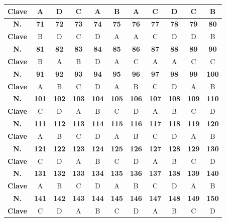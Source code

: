 \begin{center}
\begin{tabular}{|c|c|c|c|c|c|c|c|c|c|c|}
\hline
\textbf{Clave} & A & D & C & A & B & A & C & D & C & B \\
\hline
\textbf{N.} & \textbf{71} & \textbf{72} & \textbf{73} & \textbf{74} & \textbf{75} & \textbf{76} & \textbf{77} & \textbf{78} & \textbf{79} & \textbf{80} \\
\hline
\textbf{Clave} & B & D & C & D & A & A & C & D & D & B \\
\hline
\textbf{N.} & \textbf{81} & \textbf{82} & \textbf{83} & \textbf{84} & \textbf{85} & \textbf{86} & \textbf{87} & \textbf{88} & \textbf{89} & \textbf{90} \\
\hline
\textbf{Clave} & B & A & B & D & A & C & A & A & C & C \\
\hline
\textbf{N.} & \textbf{91} & \textbf{92} & \textbf{93} & \textbf{94} & \textbf{95} & \textbf{96} & \textbf{97} & \textbf{98} & \textbf{99} & \textbf{100} \\
\hline
\textbf{Clave} & A & B & C & D & A & B & C & D & A & B \\
\hline
\textbf{N.} & \textbf{101} & \textbf{102} & \textbf{103} & \textbf{104} & \textbf{105} & \textbf{106} & \textbf{107} & \textbf{108} & \textbf{109} & \textbf{110} \\
\hline
\textbf{Clave} & C & D & A & B & C & D & A & B & C & D \\
\hline
\textbf{N.} & \textbf{111} & \textbf{112} & \textbf{113} & \textbf{114} & \textbf{115} & \textbf{116} & \textbf{117} & \textbf{118} & \textbf{119} & \textbf{120} \\
\hline
\textbf{Clave} & A & B & C & D & A & B & C & D & A & B \\
\hline
\textbf{N.} & \textbf{121} & \textbf{122} & \textbf{123} & \textbf{124} & \textbf{125} & \textbf{126} & \textbf{127} & \textbf{128} & \textbf{129} & \textbf{130} \\
\hline
\textbf{Clave} & C & D & A & B & C & D & A & B & C & D \\
\hline
\textbf{N.} & \textbf{131} & \textbf{132} & \textbf{133} & \textbf{134} & \textbf{135} & \textbf{136} & \textbf{137} & \textbf{138} & \textbf{139} & \textbf{140} \\
\hline
\textbf{Clave} & A & B & C & D & A & B & C & D & A & B \\
\hline
\textbf{N.} & \textbf{141} & \textbf{142} & \textbf{143} & \textbf{144} & \textbf{145} & \textbf{146} & \textbf{147} & \textbf{148} & \textbf{149} & \textbf{150} \\
\hline
\textbf{Clave} & C & D & A & B & C & D & A & B & C & D \\

\end{tabular}
\end{center}
